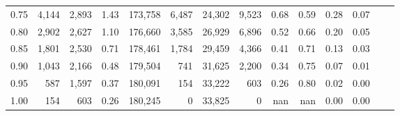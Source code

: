 \begin{tabular}{rrrrrrrrrrrrrr}
0.75 &   4,144 &  2,893 &    1.43 &  173,758 &    6,487 &  24,302 &   9,523 &  0.68 &  0.59 &  0.28 &      0.07 \\
0.80 &   2,902 &  2,627 &    1.10 &  176,660 &    3,585 &  26,929 &   6,896 &  0.52 &  0.66 &  0.20 &      0.05 \\
0.85 &   1,801 &  2,530 &    0.71 &  178,461 &    1,784 &  29,459 &   4,366 &  0.41 &  0.71 &  0.13 &      0.03 \\
0.90 &   1,043 &  2,166 &    0.48 &  179,504 &      741 &  31,625 &   2,200 &  0.34 &  0.75 &  0.07 &      0.01 \\
0.95 &     587 &  1,597 &    0.37 &  180,091 &      154 &  33,222 &     603 &  0.26 &  0.80 &  0.02 &      0.00 \\
1.00 &     154 &    603 &    0.26 &  180,245 &        0 &  33,825 &       0 &   nan &   nan &  0.00 &      0.00 \\
\bottomrule
\end{tabular}
